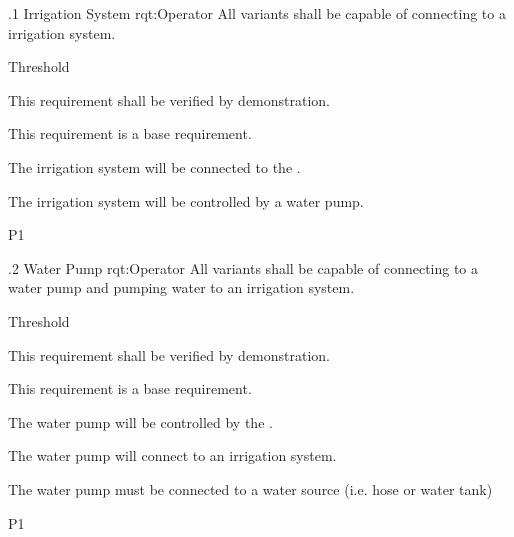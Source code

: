 \ONERQMTVKPP
{\RqtNumberBase.1}
{Irrigation System}
{rqt:Operator}
{All \ThisSys variants shall be capable of connecting to a irrigation system.}
{
	\item [All Phases] Threshold
}
{This requirement shall be verified by demonstration.}
{
	\item [N/A] This requirement is a base requirement.
}
{
  \item The irrigation system will be connected to the \ThisSystem.
  \item The irrigation system will be controlled by a water pump.
}
{P1}

\ONERQMTVKPP
{\RqtNumberBase.2}
{Water Pump}
{rqt:Operator}
{All \ThisSys variants shall be capable of connecting to a water pump and pumping water to an irrigation system.}
{
	\item [All Phases] Threshold
}
{This requirement shall be verified by demonstration.}
{
	\item [N/A] This requirement is a base requirement.
}
{
  \item The water pump will be controlled by the \ThisSystem. 
  \item The water pump will connect to an irrigation system.
  \item The water pump must be connected to a water source (i.e. hose or water tank)
}
{P1}

